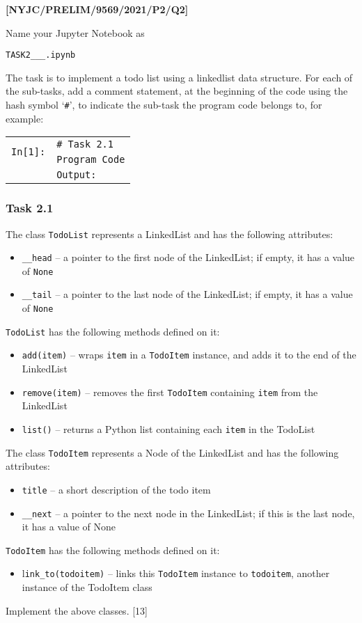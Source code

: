 \item \textbf{{[}NYJC/PRELIM/9569/2021/P2/Q2{]} }

Name your Jupyter Notebook as 

\texttt{TASK2\_<your name>\_<centre number>\_<index number>.ipynb }

The task is to implement a todo list using a linkedlist data structure.
For each of the sub-tasks, add a comment statement, at the beginning
of the code using the hash symbol \textquoteleft \texttt{\#}\textquoteright ,
to indicate the sub-task the program code belongs to, for example: 
\noindent \begin{center}
\begin{tabular}{c|l|}
\cline{2-2} 
\multirow{2}{*}{\texttt{In{[}1{]}:}} & \texttt{\# Task 2.1}\tabularnewline
 & \texttt{Program Code}\tabularnewline
\cline{2-2} 
\multicolumn{1}{c}{} & \multicolumn{1}{l}{\texttt{Output:}}\tabularnewline
\end{tabular}
\par\end{center}

\subsubsection*{Task 2.1 }

The class \texttt{TodoList} represents a LinkedList and has the following
attributes: 
\begin{itemize}
\item \texttt{\_\_head} -- a pointer to the first node of the LinkedList;
if empty, it has a value of \texttt{None} 
\item \texttt{\_\_tail} -- a pointer to the last node of the LinkedList;
if empty, it has a value of \texttt{None} 
\end{itemize}
\texttt{TodoList} has the following methods defined on it: 
\begin{itemize}
\item \texttt{add(item)} -- wraps \texttt{item} in a \texttt{TodoItem}
instance, and adds it to the end of the LinkedList 
\item \texttt{remove(item)} -- removes the first \texttt{TodoItem} containing
\texttt{item} from the LinkedList 
\item \texttt{list()} -- returns a Python list containing each \texttt{item}
in the TodoList 
\end{itemize}
The class \texttt{TodoItem} represents a Node of the LinkedList and
has the following attributes: 
\begin{itemize}
\item \texttt{title} -- a short description of the todo item 
\item \texttt{\_\_next} -- a pointer to the next node in the LinkedList;
if this is the last node, it has a value of None 
\end{itemize}
\texttt{TodoItem} has the following methods defined on it: 
\begin{itemize}
\item l\texttt{ink\_to(todoitem)} -- links this \texttt{TodoItem} instance
to \texttt{todoitem}, another instance of the TodoItem class 
\end{itemize}
Implement the above classes. \hfill{}{[}13{]}


